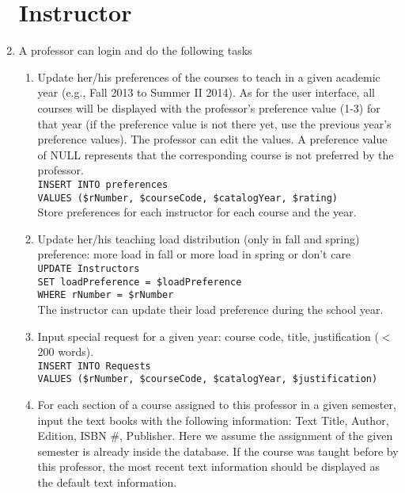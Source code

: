 \begin{enumerate}
\section{Instructor}
	\item 	A professor can login and do the following tasks
	\begin{enumerate}
		
		\item 	Update her/his preferences of the courses to teach in a given academic year (e.g., Fall 2013 to Summer II 2014). As for the user interface, all courses will be displayed with the professor’s preference value (1-3) for that year (if the preference value is not there yet, use the previous year’s preference values). The professor can edit the values. A preference value of NULL represents that the corresponding course is not preferred by the professor.\\

				\texttt{INSERT INTO preferences\\
						VALUES (\$rNumber, \$courseCode, \$catalogYear, \$rating)}\\
						
						Store preferences for each instructor for each course and the year. 
		
		\item 	Update her/his teaching load distribution (only in fall and spring) preference: more load in fall or more load in spring or don’t care\\

				\texttt{UPDATE Instructors\\
						SET loadPreference = \$loadPreference\\
						WHERE rNumber = \$rNumber}\\
						
						The instructor can update their load preference during the school year.
		
		\item 	 Input special request for a given year: course code, title, justification ($<$200 words).\\
		
				\texttt{INSERT INTO Requests\\
						VALUES (\$rNumber, \$courseCode, \$catalogYear, \$justification)}\\	
						
		\item	For each section of a course assigned to this professor in a given semester, input the text books with the following information: Text Title, Author, Edition, ISBN \#, Publisher. Here we assume the assignment of the given semester is already inside the database. If the course was taught before by this professor, the most recent text information should be displayed as the default text information.\\


\end{enumerate}
\end{enumerate}

